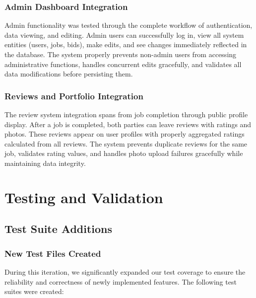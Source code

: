 \documentclass[11pt]{article}
\begin{document}
\subsubsection{Admin Dashboard Integration}
Admin functionality was tested through the complete workflow of authentication, data viewing, and editing. Admin users can successfully log in, view all system entities (users, jobs, bids), make edits, and see changes immediately reflected in the database. The system properly prevents non-admin users from accessing administrative functions, handles concurrent edits gracefully, and validates all data modifications before persisting them.

\subsubsection{Reviews and Portfolio Integration}
The review system integration spans from job completion through public profile display. After a job is completed, both parties can leave reviews with ratings and photos. These reviews appear on user profiles with properly aggregated ratings calculated from all reviews. The system prevents duplicate reviews for the same job, validates rating values, and handles photo upload failures gracefully while maintaining data integrity.

\section{Testing and Validation}

\subsection{Test Suite Additions}

\subsubsection{New Test Files Created}
During this iteration, we significantly expanded our test coverage to ensure the reliability and correctness of newly implemented features. The following test suites were created:
\end{document}
